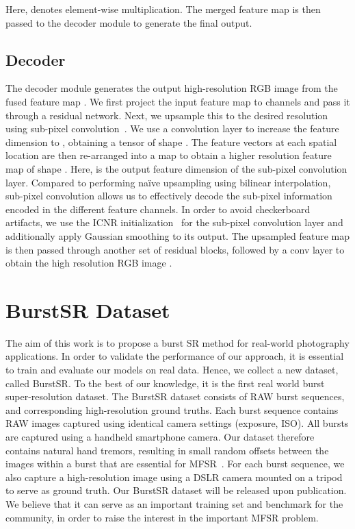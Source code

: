 Here,  denotes element-wise multiplication. The merged feature map  is then passed to the decoder module to generate the final output.

\subsection{Decoder}
The decoder module generates the output high-resolution RGB image from the fused feature map . We first project the input feature map to  channels and pass it through a residual network. Next, we upsample this to the desired resolution  using sub-pixel convolution~\cite{Shi2016RealTimeSI}. We use a convolution layer to increase the feature dimension to , obtaining a tensor of shape . The feature vectors at each spatial location are then re-arranged into a  map to obtain a higher resolution feature map of shape . Here,  is the output feature dimension of the sub-pixel convolution layer.
Compared to performing na\"ive upsampling using \eg bilinear interpolation, sub-pixel convolution allows us to effectively decode the sub-pixel information encoded in the different feature channels. 
In order to avoid checkerboard artifacts, we use the ICNR initialization~\cite{Aitken2017CheckerboardAF} for the sub-pixel convolution layer and additionally apply Gaussian smoothing to its output. 
The upsampled feature map is then passed through another set of residual blocks, followed by a conv layer to obtain the high resolution RGB image .

\section{BurstSR Dataset}
The aim of this work is to propose a burst SR method for real-world photography applications. 
In order to validate the performance of our approach, it is essential to train and evaluate our models on real data. 
Hence, we collect a new dataset, called BurstSR. To the best of our knowledge, it is the first real world burst super-resolution dataset.
The BurstSR dataset consists of  RAW burst sequences, and corresponding high-resolution ground truths. Each burst sequence contains  RAW images captured using identical camera settings (\eg exposure, ISO). All bursts are captured using a handheld smartphone camera. Our dataset therefore contains natural hand tremors, resulting in small random offsets between the images within a burst that are essential for MFSR~\cite{Tsai1984MultiframeIR}.
For each burst sequence, we also capture a high-resolution image using a DSLR camera mounted on a tripod to serve as ground truth. 
Our BurstSR dataset will be released upon publication. We believe that it can serve as an important training set and benchmark for the community, in order to raise the interest in the important MFSR problem.

